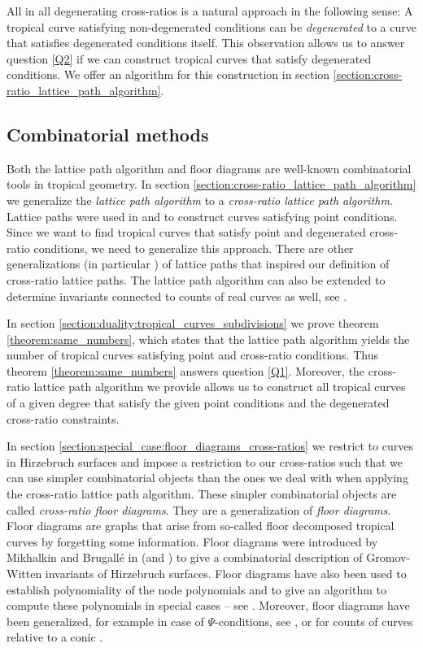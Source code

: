 \documentclass[11pt,reqno,a4]{amsart}
\theoremstyle{dotless}
\theoremstyle{definition}
\begin{document}
All in all degenerating cross-ratios is a natural approach in the following sense: A tropical curve satisfying non-degenerated conditions can be \textit{degenerated} to a curve that satisfies degenerated conditions itself. This observation allows us to answer question \ref{Q2} if we can construct tropical curves that satisfy degenerated conditions. We offer an algorithm for this construction in section \ref{section:cross-ratio_lattice_path_algorithm}.

\subsection*{Combinatorial methods} Both the lattice path algorithm and floor diagrams are well-known combinatorial tools in tropical geometry. In section \ref{section:cross-ratio_lattice_path_algorithm} we generalize the \textit{lattice path algorithm} to a \textit{cross-ratio lattice path algorithm}. Lattice paths were used in \cite{MikhalkinLatticePaths} and \cite{MikhalkinFundamental} to construct curves satisfying point conditions. Since we want to find tropical curves that satisfy point and degenerated cross-ratio conditions, we need to generalize this approach. There are other generalizations (in particular \cite{rag-rug}) of lattice paths that inspired our definition of cross-ratio lattice paths. The lattice path algorithm can also be extended to determine invariants connected to counts of real curves as well, see \cite{Shustin}. 

 In section \ref{section:duality:tropical_curves_subdivisions} we prove theorem \ref{theorem:same_numbers}, which states that the lattice path algorithm yields the number of tropical curves satisfying point and cross-ratio conditions. Thus theorem \ref{theorem:same_numbers} answers question \ref{Q1}. Moreover, the cross-ratio lattice path algorithm we provide allows us to construct all tropical curves of a given degree that satisfy the given point conditions and the degenerated cross-ratio constraints.

In section \ref{section:special_case:floor_diagrams_cross-ratios} we restrict to curves in Hirzebruch surfaces and impose a restriction to our cross-ratios such that we can use simpler combinatorial objects than the ones we deal with when applying the cross-ratio lattice path algorithm. These simpler combinatorial objects are called \textit{cross-ratio floor diagrams}. They are a generalization of \textit{floor diagrams}. Floor diagrams are graphs that arise from so-called floor decomposed tropical curves by forgetting some information. Floor diagrams were introduced by Mikhalkin and Brugall\'{e} in \cite{MikhalkinBrugalleFloorDiagIntroduction} (and \cite{MikhalkinBrugalle}) to give a combinatorial description of Gromov-Witten invariants of Hirzebruch surfaces. Floor diagrams have also been used to establish polynomiality of the node polynomials \cite{MikhalkinFomin} and to give an algorithm to compute these polynomials in special cases -- see \cite{BlockNodePoly}. Moreover, floor diagrams have been generalized, for example in case of $\Psi$-conditions, see \cite{PsiFloorDiagrams}, or for counts of curves relative to a conic \cite{Bru}.
\end{document}
